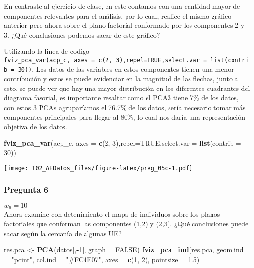 \documentclass[
]{article}
\newenvironment{Shaded}{\begin{snugshade}}{\end{snugshade}}
\newcommand{\AttributeTok}[1]{\textcolor[rgb]{0.13,0.29,0.53}{#1}}
\newcommand{\ConstantTok}[1]{\textcolor[rgb]{0.56,0.35,0.01}{#1}}
\newcommand{\DecValTok}[1]{\textcolor[rgb]{0.00,0.00,0.81}{#1}}
\newcommand{\FloatTok}[1]{\textcolor[rgb]{0.00,0.00,0.81}{#1}}
\newcommand{\FunctionTok}[1]{\textcolor[rgb]{0.13,0.29,0.53}{\textbf{#1}}}
\newcommand{\NormalTok}[1]{#1}
\newcommand{\OtherTok}[1]{\textcolor[rgb]{0.56,0.35,0.01}{#1}}
\newcommand{\SpecialCharTok}[1]{\textcolor[rgb]{0.81,0.36,0.00}{\textbf{#1}}}
\newcommand{\StringTok}[1]{\textcolor[rgb]{0.31,0.60,0.02}{#1}}
\begin{document}
En contraste al ejercicio de clase, en este contamos con una cantidad
mayor de componentes relevantes para el análisis, por lo cual, realice
el mismo gráfico anterior pero ahora sobre el plano factorial conformado
por los componentes 2 y 3. ¿Qué conclusiones podemos sacar de este
gráfico?

Utilizando la linea de codigo
\texttt{fviz\_pca\_var(acp\_c,\ axes\ =\ c(2,\ 3),repel=TRUE,select.var\ =\ list(contrib\ =\ 30))},
Los datos de las variables en estos componentes tienen una menor
contribución y estos se puede evidenciar en la magnitud de las flechas,
junto a esto, se puede ver que hay una mayor distribución en los
diferentes cuadrantes del diagrama fasorial, es importante resaltar como
el PCA3 tiene 7\% de los datos, con estos 3 PCAs agruparíamos el 76.7\%
de los datos, sería necesario tomar más componentes principales para
llegar al 80\%, lo cual nos daría una representación objetiva de los
datos.

\begin{Shaded}
\begin{Highlighting}[]
\FunctionTok{fviz\_pca\_var}\NormalTok{(acp\_c, }\AttributeTok{axes =} \FunctionTok{c}\NormalTok{(}\DecValTok{2}\NormalTok{, }\DecValTok{3}\NormalTok{),}\AttributeTok{repel=}\ConstantTok{TRUE}\NormalTok{,}\AttributeTok{select.var =} \FunctionTok{list}\NormalTok{(}\AttributeTok{contrib =} \DecValTok{30}\NormalTok{))}
\end{Highlighting}
\end{Shaded}

\texttt{[image: T02\_AEDatos\_files/figure-latex/preg\_05c-1.pdf]}

\subsubsection{Pregunta 6}\label{pregunta-6}

\(w_6=10\)\\
Ahora examine con detenimiento el mapa de individuos sobre los planos
factoriales que conforman las componentes (1,2) y (2,3). ¿Qué
conclusiones puede sacar según la cercanía de algunas UE?

\begin{Shaded}
\begin{Highlighting}[]
\NormalTok{res.pca }\OtherTok{\textless{}{-}} \FunctionTok{PCA}\NormalTok{(datos[,}\SpecialCharTok{{-}}\DecValTok{1}\NormalTok{], }\AttributeTok{graph =} \ConstantTok{FALSE}\NormalTok{)}
\FunctionTok{fviz\_pca\_ind}\NormalTok{(res.pca, }\AttributeTok{geom.ind =} \StringTok{"point"}\NormalTok{, }
             \AttributeTok{col.ind =} \StringTok{"\#FC4E07"}\NormalTok{, }
             \AttributeTok{axes =} \FunctionTok{c}\NormalTok{(}\DecValTok{1}\NormalTok{, }\DecValTok{2}\NormalTok{), }
             \AttributeTok{pointsize =} \FloatTok{1.5}\NormalTok{) }
\end{Highlighting}
\end{Shaded}
\end{document}

